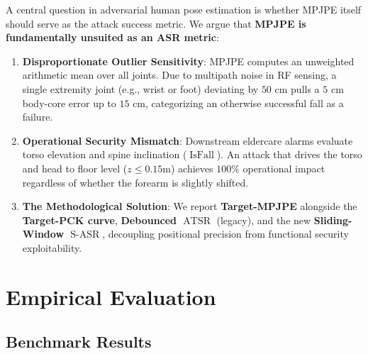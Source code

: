 \documentclass{article}
\newcommand{\IsFall}{\operatorname{IsFall}}
\newcommand{\SASR}{\operatorname{S-ASR}}
\newcommand{\ATSR}{\operatorname{ATSR}}
\begin{document}
A central question in adversarial human pose estimation is whether MPJPE itself should serve as
the attack success metric. We argue that \textbf{MPJPE is fundamentally unsuited as an ASR
metric}:
\begin{enumerate}
    \item \textbf{Disproportionate Outlier Sensitivity}: MPJPE computes an unweighted arithmetic
          mean over all joints.  Due to multipath noise in RF sensing, a single extremity joint
          (e.g., wrist or foot) deviating by $50\text{ cm}$ pulls a $5\text{ cm}$ body-core
          error up to $15\text{ cm}$, categorizing an otherwise successful fall as a failure.
    \item \textbf{Operational Security Mismatch}: Downstream eldercare alarms evaluate torso
          elevation and spine inclination ($\IsFall$). An attack that drives the torso and head
          to floor level ($z \le 0.15\text{m}$) achieves $100\%$ operational impact regardless
          of whether the forearm is slightly shifted.
    \item \textbf{The Methodological Solution}: We report \textbf{Target-MPJPE} alongside the
          \textbf{Target-PCK curve}, \textbf{Debounced $\ATSR$} (legacy), and the new
          \textbf{Sliding-Window $\SASR$}, decoupling positional precision from functional
          security exploitability.
\end{enumerate}

\section{Empirical Evaluation}

\subsection{Benchmark Results}
\end{document}

